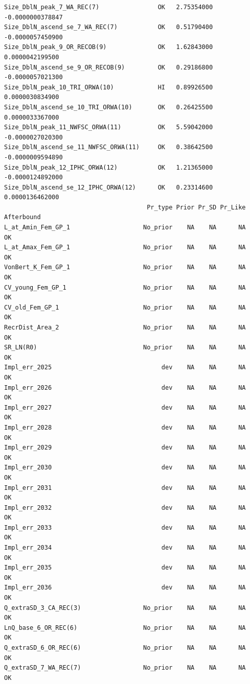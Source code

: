 \documentclass[
]{scrartcl}
\begin{document}
\begin{verbatim}
Size_DblN_peak_7_WA_REC(7)                OK   2.75354000 -0.0000000378847
Size_DblN_ascend_se_7_WA_REC(7)           OK   0.51790400 -0.0000057450900
Size_DblN_peak_9_OR_RECOB(9)              OK   1.62843000  0.0000042199500
Size_DblN_ascend_se_9_OR_RECOB(9)         OK   0.29186800 -0.0000057021300
Size_DblN_peak_10_TRI_ORWA(10)            HI   0.89926500  0.0000030834900
Size_DblN_ascend_se_10_TRI_ORWA(10)       OK   0.26425500  0.0000033367000
Size_DblN_peak_11_NWFSC_ORWA(11)          OK   5.59042000 -0.0000027020300
Size_DblN_ascend_se_11_NWFSC_ORWA(11)     OK   0.38642500 -0.0000009594890
Size_DblN_peak_12_IPHC_ORWA(12)           OK   1.21365000 -0.0000124892000
Size_DblN_ascend_se_12_IPHC_ORWA(12)      OK   0.23314600  0.0000136462000
                                       Pr_type Prior Pr_SD Pr_Like Afterbound
L_at_Amin_Fem_GP_1                    No_prior    NA    NA      NA         OK
L_at_Amax_Fem_GP_1                    No_prior    NA    NA      NA         OK
VonBert_K_Fem_GP_1                    No_prior    NA    NA      NA         OK
CV_young_Fem_GP_1                     No_prior    NA    NA      NA         OK
CV_old_Fem_GP_1                       No_prior    NA    NA      NA         OK
RecrDist_Area_2                       No_prior    NA    NA      NA         OK
SR_LN(R0)                             No_prior    NA    NA      NA         OK
Impl_err_2025                              dev    NA    NA      NA         OK
Impl_err_2026                              dev    NA    NA      NA         OK
Impl_err_2027                              dev    NA    NA      NA         OK
Impl_err_2028                              dev    NA    NA      NA         OK
Impl_err_2029                              dev    NA    NA      NA         OK
Impl_err_2030                              dev    NA    NA      NA         OK
Impl_err_2031                              dev    NA    NA      NA         OK
Impl_err_2032                              dev    NA    NA      NA         OK
Impl_err_2033                              dev    NA    NA      NA         OK
Impl_err_2034                              dev    NA    NA      NA         OK
Impl_err_2035                              dev    NA    NA      NA         OK
Impl_err_2036                              dev    NA    NA      NA         OK
Q_extraSD_3_CA_REC(3)                 No_prior    NA    NA      NA         OK
LnQ_base_6_OR_REC(6)                  No_prior    NA    NA      NA         OK
Q_extraSD_6_OR_REC(6)                 No_prior    NA    NA      NA         OK
Q_extraSD_7_WA_REC(7)                 No_prior    NA    NA      NA         OK

\end{verbatim}
\end{document}
